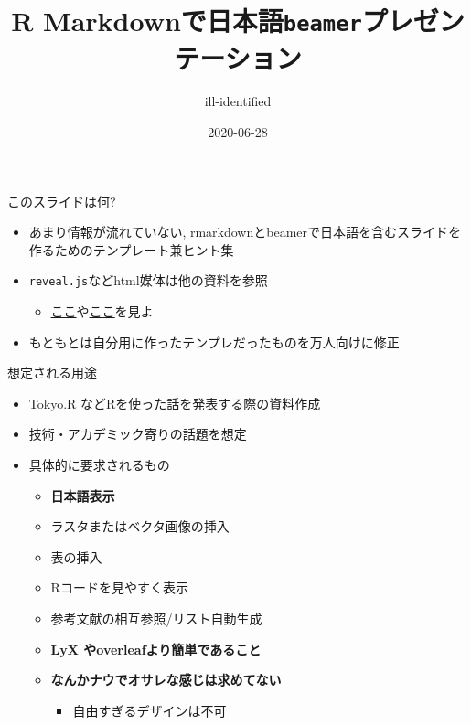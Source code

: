 \documentclass[
  12pt,
  ignorenonframetext,
]{beamer}
\title{R Markdownで日本語\texttt{beamer}プレゼンテーション}
\author{ill-identified}
\date{2020-06-28}
\providecommand{\tightlist}{%
  \setlength{\itemsep}{0pt}\setlength{\parskip}{0pt}}
\begin{document}
\frame{\titlepage}

\begin{frame}
  \tableofcontents[hideallsubsections]
\end{frame}
\begin{frame}[fragile]{このスライドは何?}
\protect\hypertarget{ux3053ux306eux30b9ux30e9ux30a4ux30c9ux306fux4f55}{}

\begin{itemize}
\tightlist
\item
  あまり情報が流れていない,
  rmarkdownとbeamerで日本語を含むスライドを作るためのテンプレート兼ヒント集
\item
  \texttt{reveal.js}などhtml媒体は他の資料を参照

  \begin{itemize}
  \tightlist
  \item
    \href{https://kazutan.github.io/SappoRoR6/rmd_slide.html\#/}{ここ}や\href{https://kazutan.github.io/fukuokaR11/intro_rmarkdown_d.html}{ここ}を見よ
  \end{itemize}
\item
  もともとは自分用に作ったテンプレだったものを万人向けに修正
\end{itemize}

\end{frame}

\begin{frame}{想定される用途}
\protect\hypertarget{ux60f3ux5b9aux3055ux308cux308bux7528ux9014}{}

\begin{itemize}
\tightlist
\item
  Tokyo.R などRを使った話を発表する際の資料作成
\item
  技術・アカデミック寄りの話題を想定
\item
  具体的に要求されるもの

  \begin{itemize}
  \tightlist
  \item
    \textbf{日本語表示}
  \item
    ラスタまたはベクタ画像の挿入
  \item
    表の挿入
  \item
    Rコードを見やすく表示
  \item
    参考文献の相互参照/リスト自動生成
  \item
    \textbf{LyX やoverleafより簡単であること}
  \item
    \textbf{なんかナウでオサレな感じは求めてない}

    \begin{itemize}
    \tightlist
    \item
      自由すぎるデザインは不可
    \end{itemize}
  \end{itemize}
\end{itemize}

\end{frame}
\end{document}
